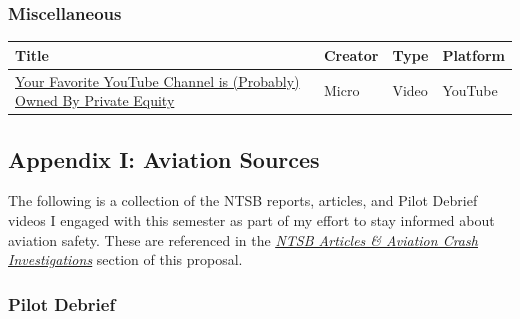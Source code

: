 \documentclass[12pt]{article}
\let\oldhyperref\hyperref
\renewcommand{\hyperref}[2][]{\oldhyperref[#1]{\textit{\uline{#2}}}}
\begin{document}
            \label{appendix:h:misc}
            \subsubsection{Miscellaneous}

            \setlength{\tabcolsep}{4pt}
            \begin{tabular}{p{} p{} p{} p{}}
            \hline
            \textbf{Title} & \textbf{Creator} & \textbf{Type} & \textbf{Platform} \\
            \hline
            \href{https://www.youtube.com/watch?v=hJ-rRXWhElI}{Your Favorite YouTube Channel is (Probably) Owned By Private Equity} & Micro & Video & YouTube \\[4pt]
            \hline
            \end{tabular}

        \newpage
        \label{appendix:i}
        \subsection{Appendix I: Aviation Sources}

            The following is a collection of the NTSB reports, articles, and Pilot Debrief videos I engaged with this semester as part of my effort to stay informed about aviation safety. These are referenced in the \hyperref[sec:ntsb]{NTSB Articles \& Aviation Crash Investigations} section of this proposal.

            \subsubsection{Pilot Debrief}
\end{document}
